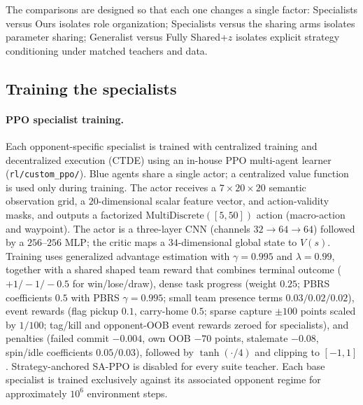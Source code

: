 The comparisons are designed so that each one changes a single factor:
Specialists versus Ours isolates role organization; Specialists versus the
sharing arms isolates parameter sharing; Generalist versus Fully Shared+\(z\)
isolates explicit strategy conditioning under matched teachers and data.

\subsection{Training the specialists}
\label{sec:method-ppo}

\paragraph{PPO specialist training.}
Each opponent-specific specialist is trained with centralized training and
decentralized execution (CTDE) using an in-house PPO multi-agent learner
(\texttt{rl/custom\_ppo/}). Blue agents share a single actor; a centralized
value function is used only during training. The actor receives a
\(7{\times}20{\times}20\) semantic observation grid, a \(20\)-dimensional
scalar feature vector, and action-validity masks, and outputs a factorized
\(\mathrm{MultiDiscrete}([5,50])\) action (macro-action and waypoint). The
actor is a three-layer CNN (channels \(32\!\to\!64\!\to\!64\)) followed by a
\(256\)--\(256\) MLP; the critic maps a \(34\)-dimensional global state to
\(V(s)\). Training uses generalized advantage estimation with
\(\gamma=0.995\) and \(\lambda=0.99\), together with a shared shaped team
reward that combines terminal outcome (\(+1/-1/-0.5\) for win/lose/draw),
dense task progress (weight \(0.25\); PBRS coefficients \(0.5\) with
PBRS \(\gamma=0.995\); small team presence terms \(0.03/0.02/0.02\)),
event rewards (flag pickup \(0.1\), carry-home \(0.5\); sparse capture
\(\pm100\) points scaled by \(1/100\); tag/kill and opponent-OOB event
rewards zeroed for specialists), and penalties (failed commit \(-0.004\),
own OOB \(-70\) points, stalemate \(-0.08\), spin/idle coefficients
\(0.05/0.03\)), followed by \(\tanh(\cdot/4)\) and clipping to
\([-1,1]\). Strategy-anchored SA-PPO is disabled for every suite teacher.
Each base specialist is trained exclusively against its associated opponent
regime for approximately \(10^6\) environment steps.

